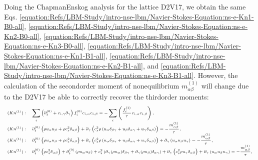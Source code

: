 \documentclass[letterpaper,10pt,english,openany,oneside]{jupyterBook}
\begin{document}
\sphinxAtStartPar
Doing the Chapman\sphinxhyphen{}Enskog analysis for the lattice D2V17, we obtain the same Eqs. \eqref{equation:Refs/LBM-Study/intro-nse-lbm/Navier-Stokes-Equation:ns-e-Kn1-B0-all}, \eqref{equation:Refs/LBM-Study/intro-nse-lbm/Navier-Stokes-Equation:ns-e-Kn2-B0-all}, \eqref{equation:Refs/LBM-Study/intro-nse-lbm/Navier-Stokes-Equation:ns-e-Kn3-B0-all}, \eqref{equation:Refs/LBM-Study/intro-nse-lbm/Navier-Stokes-Equation:ns-e-Kn1-B1-all}, \eqref{equation:Refs/LBM-Study/intro-nse-lbm/Navier-Stokes-Equation:ns-e-Kn2-B1-all}, and \eqref{equation:Refs/LBM-Study/intro-nse-lbm/Navier-Stokes-Equation:ns-e-Kn3-B1-all}. However, the calculation of the second\sphinxhyphen{}order moment of non\sphinxhyphen{}equilibrium \( m^{(1)}_{\alpha\beta}\) will change due to the D2V17 be able to correctly recover the third\sphinxhyphen{}order moments:
\begin{equation}\label{equation:Refs/LBM-Study/intro-nse-lbm/Navier-Stokes-Equation:ns-e-Kn1-B2-all-D2V17}
\begin{split}
\scriptsize
\begin{array}{ll}
(Kn^{(1)}):& \displaystyle\sum_{i}\left( \partial_{t}^{(0)} + c_{i,\gamma}\partial_{\gamma} \right)f_{i}^{(0)}c_{i,\alpha}c_{i,\beta}= - \displaystyle\sum_{i}\left(\displaystyle\frac{ f_{i}^{(1)} }{ \tau } c_{i,\alpha}c_{i,\beta} \right),\\
(Kn^{(1)}):& \partial_{t}^{(0)}  \left(\rho u_{\alpha}u_{\beta} + \rho c_{s}^{2}\delta_{\alpha\beta} \right) + \partial_{\gamma} \left(c_{s}^{2}\rho \left(u_{\alpha}\delta_{\beta\gamma} + u_{\beta}\delta_{\alpha\gamma} + u_{\gamma}\delta_{\alpha\beta} \right) \right) = - \displaystyle\frac{m^{(1)}_{\alpha\beta}}{\tau}, \\
(Kn^{(1)}):& \partial_{t}^{(0)}  \left(\rho u_{\alpha}u_{\beta} + \rho c_{s}^{2}\delta_{\alpha\beta} \right) + \partial_{\gamma} \left(c_{s}^{2}\rho \left(u_{\alpha}\delta_{\beta\gamma} + u_{\beta}\delta_{\alpha\gamma} + u_{\gamma}\delta_{\alpha\beta} \right) \right) + \partial_{\gamma}\left( u_{\alpha} u_{\beta} u_{\gamma}\right) = - \displaystyle\frac{m^{(1)}_{\alpha\beta}}{\tau},\\
(Kn^{(1)}):& \partial_{t}^{(0)}  \left(\rho c_{s}^{2}\delta_{\alpha\beta} \right) + \partial_{t}^{(0)}  \left(\rho u_{\alpha}u_{\beta} \right) +  c_{s}^{2} \left(\partial_{\gamma} (\rho u_{\alpha})\delta_{\beta\gamma} + \partial_{\gamma}(\rho u_{\beta} )\delta_{\alpha\gamma} \right) + \partial_{\gamma} \left(c_{s}^{2}\rho u_{\gamma}\delta_{\alpha\beta} \right) + \partial_{\gamma}\left( u_{\alpha} u_{\beta} u_{\gamma}\right) = - \displaystyle\frac{m^{(1)}_{\alpha\beta}}{\tau},\\

\end{array}
\end{split}
\end{equation}
\end{document}
